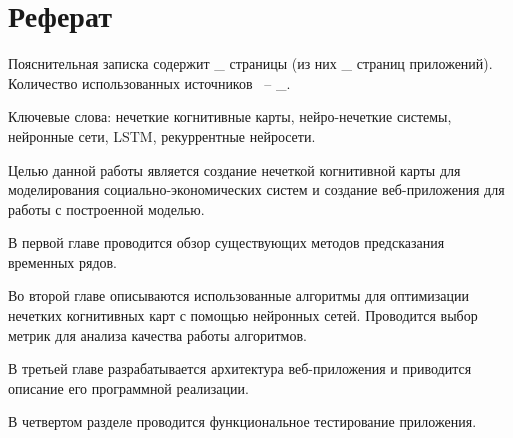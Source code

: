 \chapter*{Реферат}
\thispagestyle{plain}

Пояснительная записка содержит _ страницы (из них _ страниц приложений). Количество использованных источников ~-- _.

Ключевые слова: нечеткие когнитивные карты, нейро-нечеткие системы, нейронные сети, LSTM, рекуррентные нейросети.

Целью данной работы является создание нечеткой когнитивной карты для моделирования
социально-экономических систем и создание веб-приложения для работы с построенной моделью.

В первой главе проводится обзор существующих методов предсказания временных рядов.

Во второй главе описываются использованные алгоритмы для оптимизации нечетких когнитивных карт с помощью нейронных сетей.
Проводится выбор метрик для анализа качества работы алгоритмов.

В третьей главе разрабатывается архитектура веб-приложения и приводится описание его программной реализации.

В четвертом разделе проводится функциональное тестирование приложения.
